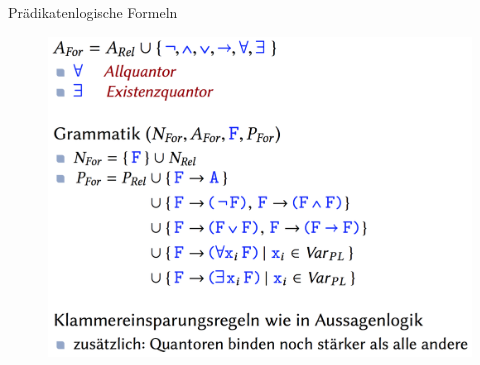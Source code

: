 \begin{frame}{Prädikatenlogische Formeln}
\begin{figure}[h!]
	\centering
	\includegraphics[scale=0.2]{PFormeln.png} \hspace{2em} 
\end{figure} 
\end{frame}

